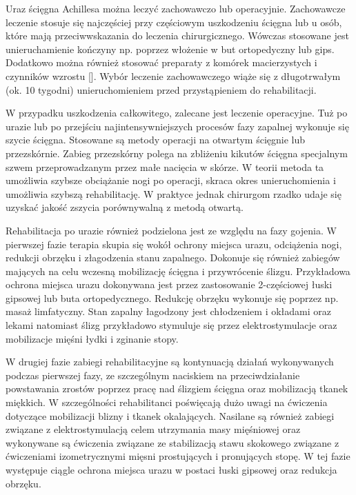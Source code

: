 Uraz ścięgna Achillesa można leczyć zachowawczo lub operacyjnie. Zachowawcze leczenie stosuje się najczęściej przy częściowym uszkodzeniu ścięgna lub u osób, które mają przeciwwskazania do leczenia chirurgicznego. Wówczas stosowane jest unieruchamienie kończyny np. poprzez włożenie w but ortopedyczny lub gips. Dodatkowo można również stosować preparaty z komórek macierzystych i czynników wzrostu []. Wybór leczenie zachowawczego wiąże się z długotrwałym (ok. 10 tygodni) unieruchomieniem przed przystąpieniem do rehabilitacji.

W przypadku uszkodzenia całkowitego, zalecane jest leczenie operacyjne. Tuż po urazie lub po przejściu najintensywniejszych procesów fazy zapalnej wykonuje się szycie ścięgna. Stosowane są metody operacji na otwartym ścięgnie lub przezskórnie. Zabieg przezskórny polega na zbliżeniu kikutów ścięgna specjalnym szwem przeprowadzanym przez małe nacięcia w skórze. W teorii metoda ta umożliwia szybsze obciążanie nogi po operacji, skraca okres unieruchomienia i umożliwia szybszą rehabilitację. W praktyce jednak chirurgom rzadko udaje się uzyskać jakość zszycia porównywalną z metodą otwartą. 

Rehabilitacja po urazie również podzielona jest ze względu na fazy gojenia. W pierwszej fazie terapia skupia się wokół ochrony miejsca urazu, odciążenia nogi, redukcji obrzęku i złagodzenia stanu zapalnego. Dokonuje się również zabiegów mających na celu wczesną mobilizację ścięgna i przywrócenie ślizgu. Przykładowa ochrona miejsca urazu dokonywana jest przez zastosowanie 2-częściowej łuski gipsowej lub buta ortopedycznego. Redukcję obrzęku wykonuje się poprzez np. masaż limfatyczny. Stan zapalny łagodzony jest chłodzeniem i okładami oraz lekami natomiast ślizg przykładowo stymuluje się przez elektrostymulacje oraz mobilizacje mięśni łydki i zginanie stopy.

W drugiej fazie zabiegi rehabilitacyjne są kontynuacją działań wykonywanych podczas pierwszej fazy, ze szczególnym naciskiem na przeciwdziałanie powstawania zrostów poprzez pracę nad ślizgiem ścięgna oraz mobilizacją tkanek miękkich. W szczególności rehabilitanci poświęcają dużo uwagi na ćwiczenia dotyczące mobilizacji blizny i tkanek okalających. Nasilane są również zabiegi związane z elektrostymulacją celem utrzymania masy mięśniowej oraz wykonywane są ćwiczenia związane ze stabilizacją stawu skokowego związane z ćwiczeniami izometrycznymi mięsni prostujących i pronujących stopę. W tej fazie występuje ciągle ochrona miejsca urazu w postaci łuski gipsowej oraz redukcja obrzęku.

